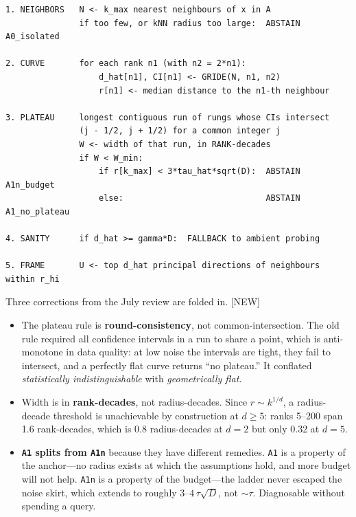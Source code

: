 \documentclass[11pt]{article}
\newcommand{\provtag}[2]{{\footnotesize\sffamily\textcolor{#1}{[#2]}}}
\newcommand{\NEWT}{\provtag{newmag}{NEW}}
\begin{document}
\begin{codebox}
\begin{verbatim}
1. NEIGHBORS   N <- k_max nearest neighbours of x in A
               if too few, or kNN radius too large:  ABSTAIN A0_isolated

2. CURVE       for each rank n1 (with n2 = 2*n1):
                   d_hat[n1], CI[n1] <- GRIDE(N, n1, n2)
                   r[n1] <- median distance to the n1-th neighbour

3. PLATEAU     longest contiguous run of rungs whose CIs intersect
               (j - 1/2, j + 1/2) for a common integer j
               W <- width of that run, in RANK-decades
               if W < W_min:
                   if r[k_max] < 3*tau_hat*sqrt(D):  ABSTAIN A1n_budget
                   else:                             ABSTAIN A1_no_plateau

4. SANITY      if d_hat >= gamma*D:  FALLBACK to ambient probing

5. FRAME       U <- top d_hat principal directions of neighbours within r_hi
\end{verbatim}
\end{codebox}

Three corrections from the July review are folded in. \NEWT

\begin{itemize}
\item The plateau rule is \textbf{round-consistency}, not common-intersection. The old rule
required all confidence intervals in a run to share a point, which is anti-monotone in data
quality: at low noise the intervals are tight, they fail to intersect, and a perfectly flat curve
returns ``no plateau.'' It conflated \emph{statistically indistinguishable} with
\emph{geometrically flat}.
\item Width is in \textbf{rank-decades}, not radius-decades. Since $r \sim k^{1/d}$, a
radius-decade threshold is unachievable by construction at $d \ge 5$: ranks 5--200 span 1.6
rank-decades, which is 0.8 radius-decades at $d=2$ but only 0.32 at $d=5$.
\item \textbf{\texttt{A1} splits from \texttt{A1n}} because they have different remedies.
\texttt{A1} is a property of the anchor---no radius exists at which the assumptions hold, and more
budget will not help. \texttt{A1n} is a property of the budget---the ladder never escaped the
noise skirt, which extends to roughly $3\text{--}4\,\tau\sqrt{D}$, not $\sim\tau$. Diagnosable
without spending a query.
\end{itemize}
\end{document}
